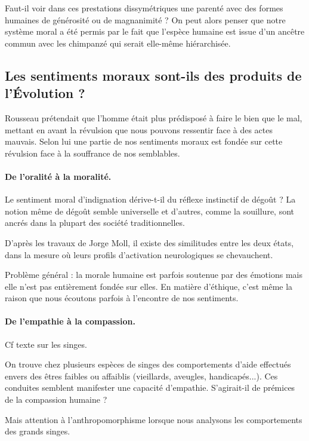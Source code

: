 	Faut-il voir dans ces prestations dissymétriques une parenté avec des formes humaines de générosité ou de magnanimité ?
	On peut alors penser que notre système moral a été permis par le fait que l'espèce humaine est issue d'un ancêtre commun avec les chimpanzé qui serait elle-même hiérarchisée.

\subsection{Les sentiments moraux sont-ils des produits de l'Évolution ?}

	Rousseau prétendait que l'homme était plus prédisposé à faire le bien que le mal, mettant en avant la révulsion que nous pouvons ressentir face à des actes mauvais.
	Selon lui une partie de nos sentiments moraux est fondée sur cette révulsion face à la souffrance de nos semblables.

	\paragraph{De l'oralité à la moralité.}
	Le sentiment moral d'indignation dérive-t-il du réflexe instinctif de dégoût ?
	La notion même de dégoût semble universelle et d'autres, comme la souillure, sont ancrés dans la plupart des société traditionnelles.

	D'après les travaux de Jorge Moll, il existe des similitudes entre les deux états, dans la mesure où leurs profils d'activation neurologiques se chevauchent.

	Problème général : la morale humaine est parfois soutenue par des émotions mais elle n'est pas entièrement fondée sur elles.
	En matière d'éthique, c'est même la raison que nous écoutons parfois à l'encontre de nos sentiments.

	\paragraph{De l'empathie à la compassion.}

	Cf texte sur les singes.

	On trouve chez plusieurs espèces de singes des comportements d'aide effectués envers des êtres faibles ou affaiblis (vieillards, aveugles, handicapés...).
	Ces conduites semblent manifester une capacité d'empathie.
	S'agirait-il de prémices de la compassion humaine ?

	Mais attention à l'anthropomorphisme lorsque nous analysons les comportements des grands singes.
